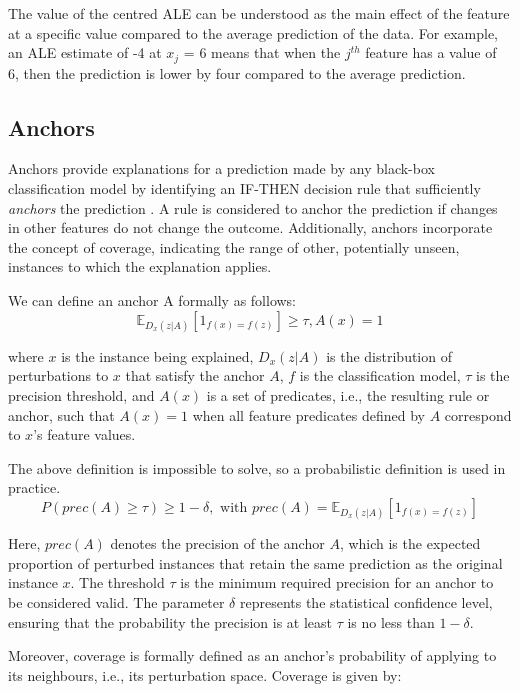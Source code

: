 The value of the centred ALE can be understood as the main effect of the feature at a specific value compared to the average prediction of the data. For example, an ALE estimate of -4 at $x_j$ = 6 means that when the $j^{th}$ feature has a value of 6, then the prediction is lower by four compared to the average prediction.


\subsection{Anchors}
Anchors provide explanations for a prediction made by any black-box classification model by identifying an IF-THEN decision rule that sufficiently \emph{anchors} the prediction \cite{ribeiro_anchors_2018}. A rule is considered to anchor the prediction if changes in other features do not change the outcome. Additionally, anchors incorporate the concept of coverage, indicating the range of other, potentially unseen, instances to which the explanation applies.

We can define an anchor A formally  as follows:
\begin{equation}
 \mathbb{E}_{D_x(z|A)}[1_{f(x) = f(z)}] \geq \tau, A(x) = 1
\end{equation}

where $x$ is the instance being explained, $D_x(z|A)$ is the distribution of perturbations to $x$ that satisfy the anchor $A$, $f$ is the classification model, $\tau$ is the precision threshold, and $A(x)$ is a set of predicates, i.e., the resulting rule or anchor, such that $A(x)=1$ when all feature predicates defined by $A$ correspond to $x$'s feature values.

The above definition is impossible to solve, so a probabilistic definition is used in practice.
\begin{equation}
 P(prec(A) \geq \tau) \geq 1 - \delta, \text{ with } prec(A) = \mathbb{E}_{D_x(z|A)}[1_{f(x) = f(z)}]
\end{equation}

Here, $prec(A)$ denotes the precision of the anchor $A$, which is the expected proportion of perturbed instances that retain the same prediction as the original instance $x$. The threshold $\tau$ is the minimum required precision for an anchor to be considered valid. The parameter $\delta$ represents the statistical confidence level, ensuring that the probability the precision is at least $\tau$ is no less than $1-\delta$.

Moreover, coverage is formally defined as an anchor's probability of applying to its neighbours, i.e., its perturbation space. Coverage is given by:


